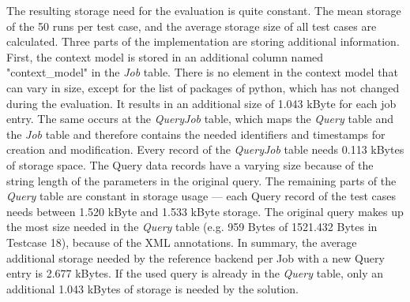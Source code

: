 \documentclass[draft,final]{vutinfth} %
\begin{document}
The resulting storage need for the evaluation is quite constant. The mean storage of the 50 runs per test case, and the average storage size of all test cases are calculated. Three parts of the implementation are storing additional information. First, the context model is stored in an additional column named "context\_model" in the \textit{Job} table. There is no element in the context model that can vary in size, except for the list of packages of python, which has not changed during the evaluation. It results in an additional size of 1.043 kByte for each job entry. The same occurs at the \textit{QueryJob} table, which maps the \textit{Query} table and the \textit{Job} table and therefore contains the needed identifiers and timestamps for creation and modification. Every record of the \textit{QueryJob} table needs 0.113 kBytes of storage space.
The Query data records have a varying size because of the string length of the parameters in the original query. The remaining parts of the \textit{Query} table are constant in storage usage — each Query record of the test cases needs between 1.520 kByte and 1.533 kByte storage. The original query makes up the most size needed in the \textit{Query} table (e.g. 959 Bytes of 1521.432 Bytes in Testcase 18), because of the XML annotations. In summary, the average additional storage needed by the reference backend per Job with a new Query entry is 2.677 kBytes. If the used query is already in the \textit{Query} table, only an additional 1.043 kBytes of storage is needed by the solution.
\end{document}
